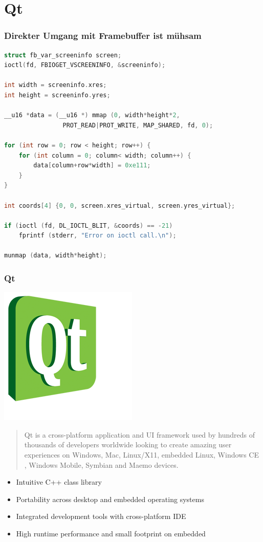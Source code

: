 \documentclass{beamer}
\begin{document}
	\section{Qt}
	
	\begin{frame}
  \frametitle{Direkter Umgang mit Framebuffer ist mühsam}
		\begin{lstlisting}[language=C, basicstyle=\scriptsize]
struct fb_var_screeninfo screen;
ioctl(fd, FBIOGET_VSCREENINFO, &screeninfo);

int width = screeninfo.xres;
int height = screeninfo.yres;

__u16 *data = (__u16 *) mmap (0, width*height*2, 
                PROT_READ|PROT_WRITE, MAP_SHARED, fd, 0);

for (int row = 0; row < height; row++) {
    for (int column = 0; column< width; column++) {
        data[column+row*width] = 0xe111;
    }
}

int coords[4] {0, 0, screen.xres_virtual, screen.yres_virtual};

if (ioctl (fd, DL_IOCTL_BLIT, &coords) == -21) 
    fprintf (stderr, "Error on ioctl call.\n");

munmap (data, width*height);
		\end{lstlisting}
	\end{frame}	
	
	\begin{frame}
		\frametitle{Qt}
		\begin{floatingfigure}[l]{1.75cm}
			\includegraphics[scale=0.3]{img/qt-logo}
		\end{floatingfigure}
		\begin{quote}
		Qt is a cross-platform application  and UI framework used by hundreds of thousands of developers worldwide looking to create amazing user experiences  on Windows, Mac, Linux/X11, embedded Linux, Windows CE , Windows Mobile, Symbian  and Maemo devices.
		\end{quote}
    \begin{itemize}
      \item Intuitive C++ class library
      \item Portability across desktop and embedded operating systems
      \item Integrated development tools with cross-platform IDE
      \item High runtime performance and small footprint on embedded
    \end{itemize}
	\end{frame}	
	
\end{document}
